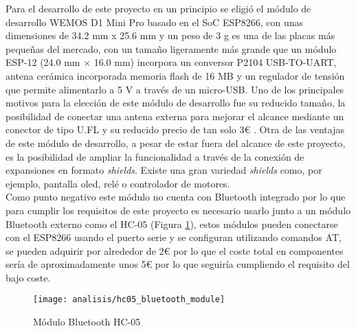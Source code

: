 \documentclass[../proyecto.tex]{subfiles}
\begin{document}
Para el desarrollo de este proyecto en un principio se eligió el módulo de desarrollo WEMOS D1 Mini Pro basado en el SoC ESP8266, con unas dimensiones de 34.2 mm x 25.6 mm y un peso de 3 g es una de las placas más pequeñas del mercado, con un tamaño ligeramente más grande que un módulo ESP-12 (24.0 mm × 16.0 mm) incorpora un conversor P2104 USB-TO-UART, antena cerámica incorporada memoria flash de 16 MB y un regulador de tensión que permite alimentarlo a 5 V a través de un micro-USB. Uno de los principales motivos para la elección de este módulo de desarrollo fue su reducido tamaño, la posibilidad de conectar una antena externa para mejorar el alcance mediante un conector de tipo U.FL y su reducido precio de tan solo 3€ \cite{lolin_official_store}. Otra de las ventajas de este módulo de desarrollo, a pesar de estar fuera del alcance de este proyecto, es la posibilidad de ampliar la funcionalidad a través de la conexión de expansiones en formato \textit{shields}. Existe una gran variedad \textit{shields} como, por ejemplo, pantalla oled, relé o controlador de motores.\\

Como punto negativo este módulo no cuenta con Bluetooth integrado por lo que para cumplir los requisitos de este proyecto es necesario usarlo junto a un módulo Bluetooth externo como el HC-05 (Figura \ref{fig:hc05_bluetooth_module}), estos módulos pueden conectarse con el ESP8266 usando el puerto serie y se configuran utilizando comandos AT, se pueden adquirir por alrededor de 2€ por lo que el coste total en componentes sería de aproximadamente unos 5€ por lo que seguiría cumpliendo el requisito del bajo coste.

\begin{figure}[H]
\centering
\texttt{[image: analisis/hc05\_bluetooth\_module]}
\caption{Módulo Bluetooth HC-05}
\label{fig:hc05_bluetooth_module}
\end{figure}
\end{document}
